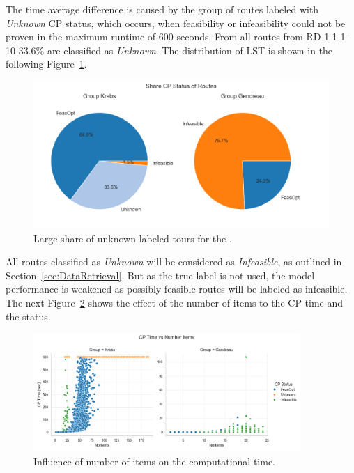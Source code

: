 The time average difference is caused by the group of routes labeled with \textit{Unknown} \gls{CP} status, which occurs, when
feasibility or infeasibility could not be proven in the maximum runtime of 600 seconds. From all routes from RD-1-1-1-10
33.6\% are classified as \textit{Unknown}. The distribution of \gls{LST} is shown in the following Figure~\ref{fig:comparison_krebs_gendreau_piechart}.

\begin{figure}[ht]
	\centering
	\includegraphics[width=\textwidth]{pictures/comparison_krebs_gendreau/pie_chart_share_cp_status.png}
	\caption{Large share of unknown labeled tours for the \krebsADataSet.}
	\label{fig:comparison_krebs_gendreau_piechart}
\end{figure}
All routes classified as \textit{Unknown} will be considered as \textit{Infeasible}, as outlined in Section~\ref{sec:DataRetrieval}. But
as the true label is not used, the model performance is weakened as possibly feasible routes will be labeled as infeasible. The
next Figure~\ref{fig:comparison_krebs_gendreau_numberItems} shows the effect of the number of items to the \gls{CP} time and the status.

\begin{figure}[ht]
	\centering
	\includegraphics[width=0.9\textwidth]{pictures/comparison_krebs_gendreau/number_items_cp_status.png}
	\caption{Influence of number of items on the computational time.}
	\label{fig:comparison_krebs_gendreau_numberItems}
\end{figure}

